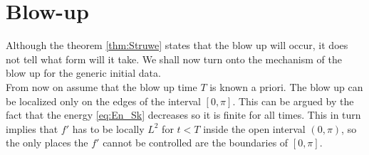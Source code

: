 \section{Blow-up}
\label{sec:blow-up}

Although the theorem \ref{thm:Struwe} states that the blow up will
occur, it does not tell what form will it take. We shall now turn onto
the mechanism of the blow up for the generic initial data.\\

From now on assume that the blow up time $T$ is known a priori. The
blow up can be localized only on the edges of the interval
$[0,\pi]$. This can be argued by the fact that the energy
\eqref{eq:En_Sk} decreases so it is finite for all times. This in turn
implies that $f'$ has to be locally $L^2$ for $t<T$ inside the open
interval $(0,\pi)$, so the only places the $f'$ cannot be controlled
are the boundaries of $[0,\pi]$.\\

